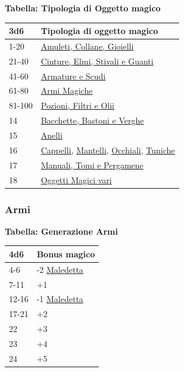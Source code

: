 \begin{multicols}{2}
{\medskip

\textbf{Tabella: Tipologia di Oggetto magico}\label{tipologiaoggettomagico}\hypertarget{tipologiaoggettomagico}{}

{\small \begin{tabularx}{\linewidth}{ll}
		\toprule
\rowcolor{gray!20}\textbf{3d6}& \textbf{Tipologia di oggetto magico}\\
\toprule
1-20 &\hyperlink{amuleticollanegioielli}{Amuleti, Collane, Gioielli}\\
\rowcolor{gray!20}21-40 &\hyperlink{cintureelmi}{Cinture, Elmi, Stivali e Guanti}\\
41-60 &\hyperlink{armatureescudi}{Armature e Scudi}\\
\rowcolor{gray!20}61-80 &\hyperlink{armimagiche}{Armi Magiche}\\
81-100 &\hyperlink{pozionifiltri}{Pozioni, Filtri e Olii}\\
\rowcolor{gray!20}14&\hyperlink{bastonibacchette}{Bacchette, Bastoni e Verghe}\\
15&\hyperlink{anellimagici}{Anelli}\\
\rowcolor{gray!20}16&\hyperlink{Cappelli}{Cappelli}, \hyperlink{Mantelli}{Mantelli}, \hyperlink{OcchialidaNotte}{Occhiali}, \hyperlink{Tuniche}{Tuniche}\\
17&\hyperlink{manualitomi}{Manuali, Tomi e Pergamene}\\
\rowcolor{gray!20}18&\hyperlink{oggettimagicivari}{Oggetti Magici vari}
\end{tabularx}}

\subsubsection{Armi}

\textbf{Tabella: Generazione Armi}\hypertarget{armimagiche}{}\label{armimagiche}

\medskip

{\small\begin{tabularx}{\linewidth}{ll}
		\toprule
\rowcolor{gray!20}\textbf{4d6} & \textbf{Bonus magico}\\
\toprule
4-6 & -2 \hyperlink{Arma maledetta}{Maledetta}\\
\rowcolor{gray!20}7-11 &+1\\
12-16 & -1 \hyperlink{Arma maledetta}{Maledetta}\\
\rowcolor{gray!20}17-21 & +2\\
22 & +3\\
\rowcolor{gray!20}23 & +4\\
24 &+5\\
\end{tabularx}}

}
\end{multicols}
